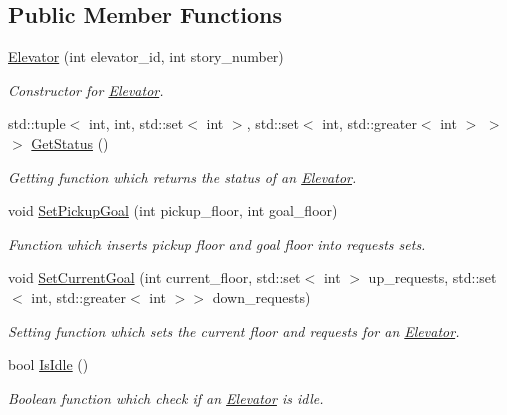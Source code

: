 \subsection*{Public Member Functions}
\begin{DoxyCompactItemize}
\item 
\mbox{\hyperlink{class_elevator_aa8a3857a468b3903c6f72032dd73c302}{Elevator}} (int elevator\+\_\+id, int story\+\_\+number)
\begin{DoxyCompactList}\small\item\em Constructor for \mbox{\hyperlink{class_elevator}{Elevator}}. \end{DoxyCompactList}\item 
std\+::tuple$<$ int, int, std\+::set$<$ int $>$, std\+::set$<$ int, std\+::greater$<$ int $>$ $>$ $>$ \mbox{\hyperlink{class_elevator_af12cb808503563d585d4851f341b5164}{Get\+Status}} ()
\begin{DoxyCompactList}\small\item\em Getting function which returns the status of an \mbox{\hyperlink{class_elevator}{Elevator}}. \end{DoxyCompactList}\item 
void \mbox{\hyperlink{class_elevator_a78899803925c5f62c67c911c9416f0ca}{Set\+Pickup\+Goal}} (int pickup\+\_\+floor, int goal\+\_\+floor)
\begin{DoxyCompactList}\small\item\em Function which inserts pickup floor and goal floor into requests sets. \end{DoxyCompactList}\item 
void \mbox{\hyperlink{class_elevator_afc40bd3ded42a639e8dc7a4f1827feea}{Set\+Current\+Goal}} (int current\+\_\+floor, std\+::set$<$ int $>$ up\+\_\+requests, std\+::set$<$ int, std\+::greater$<$ int $>$$>$ down\+\_\+requests)
\begin{DoxyCompactList}\small\item\em Setting function which sets the current floor and requests for an \mbox{\hyperlink{class_elevator}{Elevator}}. \end{DoxyCompactList}\item 
bool \mbox{\hyperlink{class_elevator_a3d253407ad2eae654d8fb5882b237ae4}{Is\+Idle}} ()
\begin{DoxyCompactList}\small\item\em Boolean function which check if an \mbox{\hyperlink{class_elevator}{Elevator}} is idle. \end{DoxyCompactList}\item 
$$
\end{DoxyCompactItemize}
